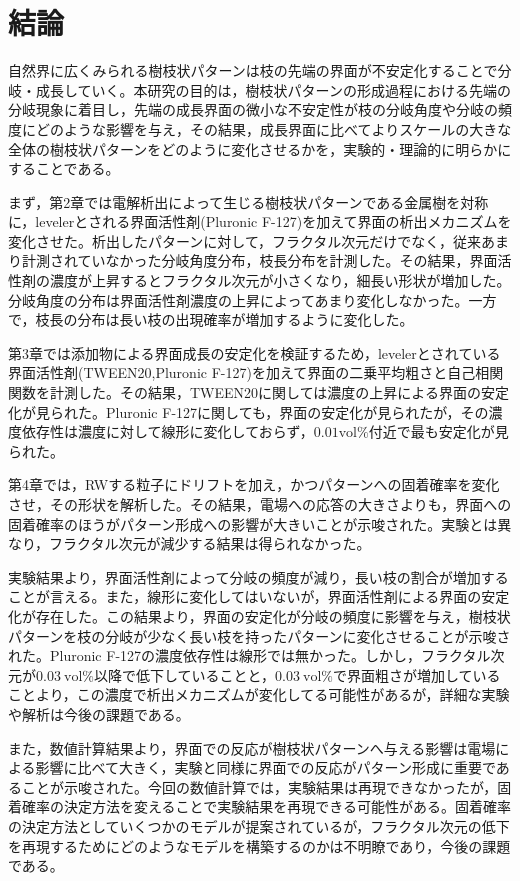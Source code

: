 \documentclass[autodetect-engine,dvi=dvipdfmx,a4paper,ja=standard,oneside,openany,11pt]{bxjsbook}
\begin{document}
\chapter{結論}
自然界に広くみられる樹枝状パターンは枝の先端の界面が不安定化することで分岐・成長していく。本研究の目的は，樹枝状パターンの形成過程における先端の分岐現象に着目し，先端の成長界面の微小な不安定性が枝の分岐角度や分岐の頻度にどのような影響を与え，その結果，成長界面に比べてよりスケールの大きな全体の樹枝状パターンをどのように変化させるかを，実験的・理論的に明らかにすることである。

まず，第2章では電解析出によって生じる樹枝状パターンである金属樹を対称に，levelerとされる界面活性剤(Pluronic F-127)を加えて界面の析出メカニズムを変化させた。析出したパターンに対して，フラクタル次元だけでなく，従来あまり計測されていなかった分岐角度分布，枝長分布を計測した。その結果，界面活性剤の濃度が上昇するとフラクタル次元が小さくなり，細長い形状が増加した。分岐角度の分布は界面活性剤濃度の上昇によってあまり変化しなかった。一方で，枝長の分布は長い枝の出現確率が増加するように変化した。

第3章では添加物による界面成長の安定化を検証するため，levelerとされている界面活性剤(TWEEN20,Pluronic F-127)を加えて界面の二乗平均粗さと自己相関関数を計測した。その結果，TWEEN20に関しては濃度の上昇による界面の安定化が見られた。Pluronic F-127に関しても，界面の安定化が見られたが，その濃度依存性は濃度に対して線形に変化しておらず，$0.01 \mathrm{vol\%}$付近で最も安定化が見られた。

第4章では，RWする粒子にドリフトを加え，かつパターンへの固着確率を変化させ，その形状を解析した。その結果，電場への応答の大きさよりも，界面への固着確率のほうがパターン形成への影響が大きいことが示唆された。実験とは異なり，フラクタル次元が減少する結果は得られなかった。

実験結果より，界面活性剤によって分岐の頻度が減り，長い枝の割合が増加することが言える。また，線形に変化してはいないが，界面活性剤による界面の安定化が存在した。この結果より，界面の安定化が分岐の頻度に影響を与え，樹枝状パターンを枝の分岐が少なく長い枝を持ったパターンに変化させることが示唆された。Pluronic F-127の濃度依存性は線形では無かった。しかし，フラクタル次元が$\SI{0.03}{\mathrm{vol\%}}$以降で低下していることと，$\SI{0.03}{\mathrm{vol\%}}$で界面粗さが増加していることより，この濃度で析出メカニズムが変化してる可能性があるが，詳細な実験や解析は今後の課題である。

また，数値計算結果より，界面での反応が樹枝状パターンへ与える影響は電場による影響に比べて大きく，実験と同様に界面での反応がパターン形成に重要であることが示唆された。今回の数値計算では，実験結果は再現できなかったが，固着確率の決定方法を変えることで実験結果を再現できる可能性がある。固着確率の決定方法としていくつかのモデル\cite{vicsek1984pattern}\cite{nittmann1986tip}が提案されているが，フラクタル次元の低下を再現するためにどのようなモデルを構築するのかは不明瞭であり，今後の課題である。

\ifdraft{
  
  
}{}
\end{document}
